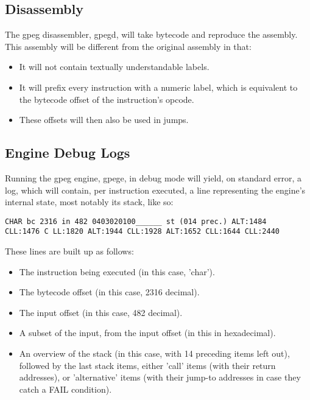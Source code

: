 \subsection{Disassembly}

The gpeg disassembler, gpegd, will take bytecode and reproduce the
assembly. This assembly will be different from the original assembly
in that:

\begin{itemize}
\item It will not contain textually understandable labels.
\item It will prefix every instruction with a numeric label, which is
      equivalent to the bytecode offset of the instruction's opcode.
\item These offsets will then also be used in jumps.
\end{itemize}

\subsection{Engine Debug Logs}

Running the gpeg engine, gpege, in debug mode will yield, on standard error,
a log, which will contain, per instruction executed, a line representing
the engine's internal state, most notably its stack, like so:

\begin{myquote}
\begin{verbatim}
CHAR bc 2316 in 482 0403020100______ st (014 prec.) ALT:1484
CLL:1476 C LL:1820 ALT:1944 CLL:1928 ALT:1652 CLL:1644 CLL:2440
\end{verbatim}
\end{myquote}

These lines are built up as follows:

\begin{itemize}
\item The instruction being executed (in this case, 'char').
\item The bytecode offset (in this case, 2316 decimal).
\item The input offset (in this case, 482 decimal).
\item A subset of the input, from the input offset (in this in hexadecimal).
\item An overview of the stack (in this case, with 14 preceding items left
      out), followed by the last stack items, either 'call' items
      (with their return addresses), or 'alternative' items
      (with their jump-to addresses in case they catch a FAIL condition).
\end{itemize}


